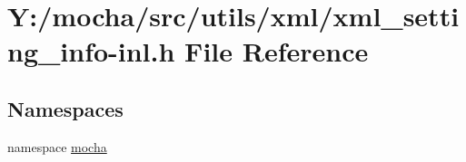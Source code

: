 \hypertarget{xml__setting__info-inl_8h}{
\section{Y:/mocha/src/utils/xml/xml\_\-setting\_\-info-\/inl.h File Reference}
\label{xml__setting__info-inl_8h}
}
\subsection*{Namespaces}
\begin{DoxyCompactItemize}
\item 
namespace \hyperlink{namespacemocha}{mocha}
\end{DoxyCompactItemize}
